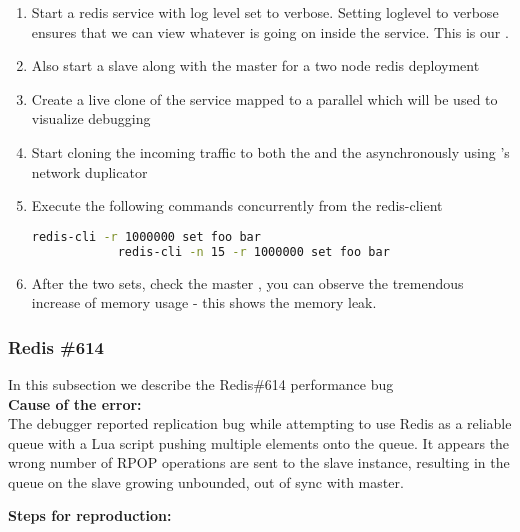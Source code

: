 \begin{adjustwidth}{0.5cm}{}
	\begin{enumerate}
		\item Start a redis service with log level set to verbose. Setting loglevel to verbose ensures that we can view whatever is going on inside the service. This is our \productioncontainer.
		\item Also start a slave along with the master for a two node redis deployment
		\item Create a live clone of the service mapped to a parallel \debugcontainer which will be used to visualize debugging
		\item Start cloning the incoming traffic to both the \productioncontainer and the \debugcontainer asynchronously using \parikshan's network duplicator
		
		\item Execute the following commands concurrently from the redis-client
		
		\begin{lstlisting}[language=sh]
			redis-cli -r 1000000 set foo bar
			redis-cli -n 15 -r 1000000 set foo bar
		\end{lstlisting}
		
		\item After the two sets, check the master \debugcontainer, you can observe the tremendous increase of memory usage - this shows the memory leak.
		
	\end{enumerate}
\end{adjustwidth}	


\subsubsection{Redis \#614}

In this subsection we describe the Redis\#614 performance bug \\

\noindent \textbf{Cause of the error:} \\

The debugger reported replication bug while attempting to use Redis as a reliable queue with a Lua script pushing multiple elements onto the queue. 
It appears the wrong number of RPOP operations are sent to the slave instance, resulting in the queue on the slave growing unbounded, out of sync with master.

\noindent \textbf{Steps for reproduction:} \\


